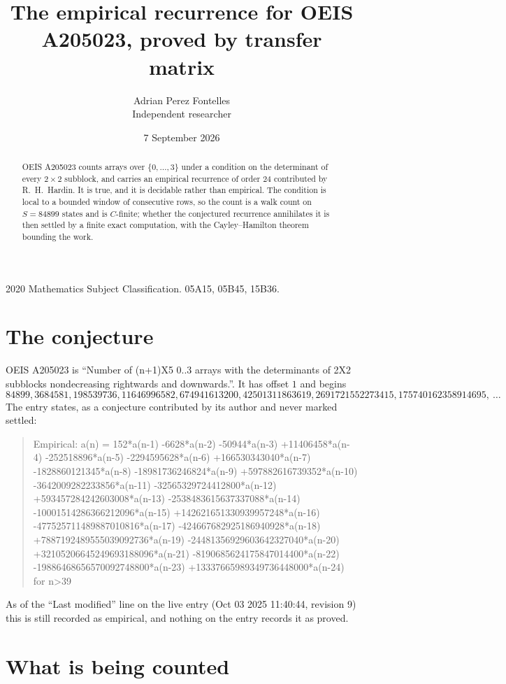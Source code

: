 \documentclass[11pt,a4paper]{article}
\title{The empirical recurrence for OEIS A205023, proved by transfer matrix}
\author{Adrian Perez Fontelles\\ \small Independent researcher}
\date{7 September 2026}
\theoremstyle{plain}
\theoremstyle{definition}
\begin{document}
\maketitle

\begin{abstract}
OEIS A205023 counts arrays over $\{0,\dots,3\}$ under a condition on the determinant of every
$2\times2$ subblock, and carries an empirical recurrence of order $24$ contributed by
R.~H.~Hardin. It is true, and it is decidable rather than empirical. The condition is local to
a bounded window of consecutive rows, so the count is a walk count on $S=84899$ states and is
$C$-finite; whether the conjectured recurrence annihilates it is then settled by a finite exact
computation, with the Cayley--Hamilton theorem bounding the work.
\end{abstract}

\noindent\small 2020 Mathematics Subject Classification. 05A15, 05B45, 15B36.\normalsize

\section{The conjecture}

OEIS A205023 is ``Number of (n+1)X5 0..3 arrays with the determinants of 2X2 subblocks nondecreasing rightwards and downwards.''. It has offset $1$ and begins
\[
84899, 3684581, 198539736, 11646996582, 674941613200, 42501311863619, 2691721552273415, 175740162358914695,\ \dots
\]
The entry states, as a conjecture contributed by its author and never marked settled:
\begin{quote}
Empirical: a(n) = 152*a(n-1) -6628*a(n-2) -50944*a(n-3) +11406458*a(n-4) -252518896*a(n-5) -2294595628*a(n-6) +166530343040*a(n-7) -1828860121345*a(n-8) -18981736246824*a(n-9) +597882616739352*a(n-10) -3642009282233856*a(n-11) -32565329724412800*a(n-12) +593457284242603008*a(n-13) -2538483615637337088*a(n-14) -10001514286366212096*a(n-15) +142621651330939957248*a(n-16) -477525711489887010816*a(n-17) -424667682925186940928*a(n-18) +7887192489555039092736*a(n-19) -24481356929603642327040*a(n-20) +32105206645249693188096*a(n-21) -8190685624175847014400*a(n-22) -19886468656570092748800*a(n-23) +13337665989349736448000*a(n-24) for n>39
\end{quote}
As of the ``Last modified'' line on the live entry (Oct 03 2025 11:40:44, revision 9) this is still
recorded as empirical, and nothing on the entry records it as proved.

\section{What is being counted}
\end{document}
